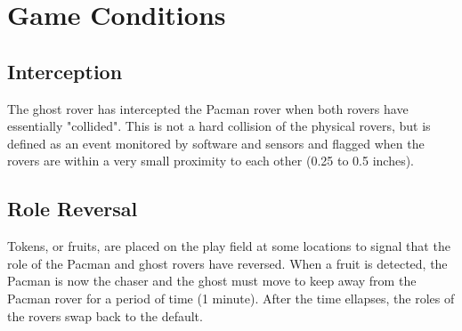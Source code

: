 \documentclass[12pt,letterpaper]{article}
\begin{document}
\section{Game Conditions}
\subsection{Interception}
The ghost rover has intercepted the Pacman rover when both rovers have essentially "collided". This is not a hard collision of the physical rovers, but is defined as an event monitored by software and sensors and flagged when the rovers are within a very small proximity to each other (0.25 to 0.5 inches). 

\subsection{Role Reversal}
Tokens, or fruits, are placed on the play field at some locations to signal that the role of the Pacman and ghost rovers have reversed. When a fruit is detected, the Pacman is now the chaser and the ghost must move to keep away from the Pacman rover for a period of time (1 minute). After the time ellapses, the roles of the rovers swap back to the default. 
\end{document}
